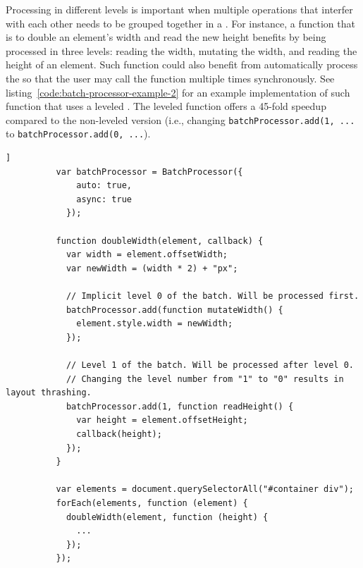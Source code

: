 \documentclass[a4paper,11pt]{kth-mag}
\newcommand{\code}[1]{\texttt{#1}}
\begin{document}
        Processing  in different levels is important when multiple operations that interfer with each other needs to be grouped together in a .
        For instance, a function that is to double an \gls{element}'s width and read the new height benefits by being  processed in three levels: reading the width, mutating the width, and reading the height of an \gls{element}.
        Such function could also benefit from automatically process the  so that the user may call the function multiple times synchronously.
        See listing~\ref{code:batch-processor-example-2} for an example implementation of such function that uses a leveled .
        The leveled function offers a 45-fold speedup compared to the non-leveled version (i.e., changing \code{batchProcessor.add(1, ...} to \code{batchProcessor.add(0, ...}).
        \begin{lstlisting}[gobble=10,label={code:batch-processor-example-2},caption={Example function that doubles an \gls{element}'s width and returns the new height with a callback. The function uses the leveled \glslink{batch processing}{batch processor} to avoid \gls{layout thrashing} and thus gains a 45-fold speedup.},captionpos=b]]
          var batchProcessor = BatchProcessor({
              auto: true,
              async: true
            });

          function doubleWidth(element, callback) {
            var width = element.offsetWidth;
            var newWidth = (width * 2) + "px";

            // Implicit level 0 of the batch. Will be processed first.
            batchProcessor.add(function mutateWidth() {
              element.style.width = newWidth;
            });

            // Level 1 of the batch. Will be processed after level 0.
            // Changing the level number from "1" to "0" results in layout thrashing.
            batchProcessor.add(1, function readHeight() {
              var height = element.offsetHeight;
              callback(height);
            });
          }

          var elements = document.querySelectorAll("#container div");
          forEach(elements, function (element) {
            doubleWidth(element, function (height) {
              ...
            });
          });
        \end{lstlisting}
\end{document}
